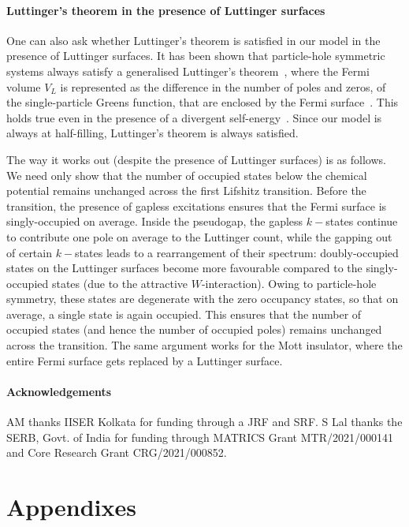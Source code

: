 \documentclass[%
 reprint,
superscriptaddress,
groupedaddress,
 amsmath,amssymb,
 aps,
prl
]{revtex4-2}
\begin{document}
\paragraph{Luttinger's theorem in the presence of Luttinger surfaces}
One can also ask whether Luttinger's theorem is satisfied in our model in the presence of Luttinger surfaces. It has been shown that particle-hole symmetric systems always satisfy a generalised Luttinger's theorem~\cite{seki2017topological}, where the Fermi volume $V_L$ is represented as the difference in the number of poles and zeros, of the single-particle Greens function, that are enclosed by the Fermi surface~\cite{seki2017topological}. This holds true even in the presence of a divergent self-energy~\cite{Phillips2013}. Since our model is always at half-filling, Luttinger's theorem is always satisfied. 

The way it works out (despite the presence of Luttinger surfaces) is as follows. We need only show that the number of occupied states below the chemical potential remains unchanged across the first Lifshitz transition. Before the transition, the presence of gapless excitations ensures that the Fermi surface is singly-occupied on average. Inside the pseudogap, the gapless $k-$states continue to contribute one pole on average to the Luttinger count, while the gapping out of certain $k-$states leads to a rearrangement of their spectrum: doubly-occupied states on the Luttinger surfaces become more favourable compared to the singly-occupied states (due to the attractive $W$-interaction). Owing to particle-hole symmetry, these states are degenerate with the zero occupancy states, so that on average, a single state is again occupied. This ensures that the number of occupied states (and hence the number of occupied poles) remains unchanged across the transition. The same argument works for the Mott insulator, where the entire Fermi surface gets replaced by a Luttinger surface.

\paragraph*{Acknowledgements}
AM thanks IISER Kolkata for funding through a JRF and SRF. S Lal thanks the SERB, Govt. of India for funding through MATRICS Grant MTR/2021/000141 and Core Research Grant CRG/2021/000852.

\appendix

\section{Appendixes}

\end{document}
